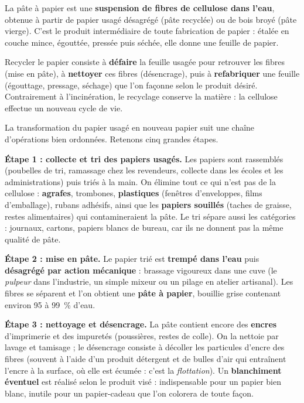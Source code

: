 \documentclass[11pt]{article}
\newcommand{\cle}[1]{{\popxbold\color{popdark}#1}}
\newcounter{popsec}
\newcounter{popsub}
\newcommand{\courssub}[1]{%
  \stepcounter{popsub}%
  \par\vspace{9pt}\noindent{\popxbold\fontsize{11.5}{13}\selectfont\color{popink}{\color{poporange}\thepopsec.\thepopsub}\hspace{6pt}#1}\par\nopagebreak\vspace{4pt}
}
\begin{document}
\begin{definition}
La \cle{pâte à papier} est une \textbf{suspension de fibres de cellulose dans l'eau}, obtenue à partir de papier usagé désagrégé (pâte recyclée) ou de bois broyé (pâte vierge). C'est le produit intermédiaire de toute fabrication de papier : étalée en couche mince, égouttée, pressée puis séchée, elle donne une feuille de papier.
\end{definition}

\begin{aretenir}
Recycler le papier consiste à \textbf{défaire} la feuille usagée pour retrouver les fibres (mise en pâte), à \textbf{nettoyer} ces fibres (désencrage), puis à \textbf{refabriquer} une feuille (égouttage, pressage, séchage) que l'on façonne selon le produit désiré. Contrairement à l'incinération, le recyclage conserve la matière : la cellulose effectue un nouveau cycle de vie.
\end{aretenir}

\courssub{Les étapes du recyclage du papier}

La transformation du papier usagé en nouveau papier suit une chaîne d'opérations bien ordonnées. Retenons cinq grandes étapes.

\textbf{Étape 1 : collecte et tri des papiers usagés.} Les papiers sont rassemblés (poubelles de tri, ramassage chez les revendeurs, collecte dans les écoles et les administrations) puis triés à la main. On élimine tout ce qui n'est pas de la cellulose : \textbf{agrafes}, trombones, \textbf{plastiques} (fenêtres d'enveloppes, films d'emballage), rubans adhésifs, ainsi que les \textbf{papiers souillés} (taches de graisse, restes alimentaires) qui contamineraient la pâte. Le tri sépare aussi les catégories : journaux, cartons, papiers blancs de bureau, car ils ne donnent pas la même qualité de pâte.

\textbf{Étape 2 : mise en pâte.} Le papier trié est \textbf{trempé dans l'eau} puis \textbf{désagrégé par action mécanique} : brassage vigoureux dans une cuve (le \emph{pulpeur} dans l'industrie, un simple mixeur ou un pilage en atelier artisanal). Les fibres se séparent et l'on obtient une \textbf{pâte à papier}, bouillie grise contenant environ \num{95} à \SI{99}{\percent} d'eau.

\textbf{Étape 3 : nettoyage et désencrage.} La pâte contient encore des \textbf{encres} d'imprimerie et des impuretés (poussières, restes de colle). On la nettoie par lavage et tamisage ; le \cle{désencrage} consiste à décoller les particules d'encre des fibres (souvent à l'aide d'un produit détergent et de bulles d'air qui entraînent l'encre à la surface, où elle est écumée : c'est la \emph{flottation}). Un \textbf{blanchiment éventuel} est réalisé selon le produit visé : indispensable pour un papier bien blanc, inutile pour un papier-cadeau que l'on colorera de toute façon.
\end{document}
